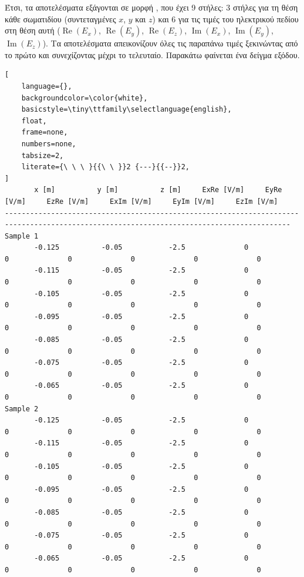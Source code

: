 Έτσι, τα αποτελέσματα εξάγονται σε μορφή , που έχει 9 στήλες: 3 στήλες για τη θέση κάθε σωματιδίου (συντεταγμένες $x$, $y$ και $z$) και 6 για τις τιμές του ηλεκτρικού πεδίου στη θέση αυτή ($\operatorname{Re}(E_x)$, $\operatorname{Re}(E_y)$, $\operatorname{Re}(E_z)$, $\operatorname{Im}(E_x)$, $\operatorname{Im}(E_y)$, $\operatorname{Im}(E_z)$).
Τα αποτελέσματα απεικονίζουν όλες τις παραπάνω τιμές ξεκινώντας από το πρώτο  και συνεχίζοντας μέχρι το τελευταίο.
Παρακάτω φαίνεται ένα δείγμα εξόδου.
\begin{lstlisting}[
	language={},
	backgroundcolor=\color{white},
	basicstyle=\tiny\ttfamily\selectlanguage{english},
	float,
	frame=none,
    numbers=none,                        
    tabsize=2,	
    literate={\ \ \ }{{\ \ }}2 {---}{{--}}2,
]
       x [m]          y [m]          z [m]     ExRe [V/m]     EyRe [V/m]     EzRe [V/m]     ExIm [V/m]     EyIm [V/m]     EzIm [V/m]  
------------------------------------------------------------------------------------------------------------------------------------------
Sample 1
       -0.125          -0.05           -2.5              0              0              0              0              0              0
       -0.115          -0.05           -2.5              0              0              0              0              0              0
       -0.105          -0.05           -2.5              0              0              0              0              0              0
       -0.095          -0.05           -2.5              0              0              0              0              0              0
       -0.085          -0.05           -2.5              0              0              0              0              0              0
       -0.075          -0.05           -2.5              0              0              0              0              0              0
       -0.065          -0.05           -2.5              0              0              0              0              0              0
Sample 2
       -0.125          -0.05           -2.5              0              0              0              0              0              0
       -0.115          -0.05           -2.5              0              0              0              0              0              0
       -0.105          -0.05           -2.5              0              0              0              0              0              0
       -0.095          -0.05           -2.5              0              0              0              0              0              0
       -0.085          -0.05           -2.5              0              0              0              0              0              0
       -0.075          -0.05           -2.5              0              0              0              0              0              0
       -0.065          -0.05           -2.5              0              0              0              0              0              0
\end{lstlisting}

